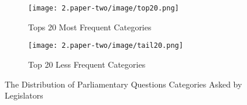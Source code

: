 \begin{figure}[hb!]
    \centering
    \begin{subfigure}[t]{0.48\textwidth}
    \texttt{[image: 2.paper-two/image/top20.png]}
    \caption{Tops 20 Most Frequent Categories} 
    \label{fig:top20}
    \end{subfigure}
    \centering
    \begin{subfigure}[t]{0.48\textwidth}
    \texttt{[image: 2.paper-two/image/tail20.png]}
    \caption{Top 20 Less Frequent Categories}
    \label{fig:tail20}    
    \end{subfigure}
    \caption{The Distribution of Parliamentary Questions Categories Asked by Legislators}
    \label{fig:discriptionpq}    
\end{figure}
